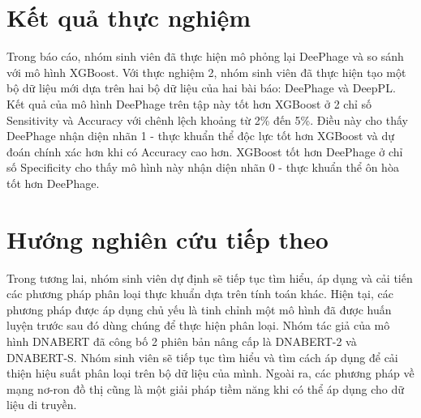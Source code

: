 \section{Kết quả thực nghiệm}
Trong báo cáo, nhóm sinh viên đã thực hiện mô phỏng lại DeePhage và so sánh với mô hình XGBoost. Với thực nghiệm 2, nhóm sinh viên đã thực hiện tạo một bộ dữ liệu mới dựa trên hai bộ dữ liệu của hai bài báo: DeePhage\cite{wu2021deephage} và DeepPL\cite{zhang2024deeppl}. Kết quả của mô hình DeePhage trên tập này tốt hơn XGBoost ở 2 chỉ số Sensitivity và Accuracy với chênh lệch khoảng từ 2\% đến 5\%. Điều này cho thấy DeePhage nhận diện nhãn 1 - thực khuẩn thể độc lực tốt hơn XGBoost và dự đoán chính xác hơn khi có Accuracy cao hơn. XGBoost tốt hơn DeePhage ở chỉ số Specificity cho thấy mô hình này nhận diện nhãn 0 - thực khuẩn thể ôn hòa tốt hơn DeePhage.

\section{Hướng nghiên cứu tiếp theo}
Trong tương lai, nhóm sinh viên dự định sẽ tiếp tục tìm hiểu, áp dụng và cải tiến các phương pháp phân loại thực khuẩn dựa trên tính toán khác. Hiện tại, các phương pháp được áp dụng chủ yếu là tinh chỉnh một mô hình đã được huấn luyện trước sau đó dùng chúng để thực hiện phân loại. Nhóm tác giả của mô hình DNABERT\cite{ji2021dnabert} đã công bố 2 phiên bản nâng cấp là DNABERT-2\cite{zhou2023dnabert} và DNABERT-S\cite{zhou2024dnabert}. Nhóm sinh viên sẽ tiếp tục tìm hiểu và tìm cách áp dụng để cải thiện hiệu suất phân loại trên bộ dữ liệu của mình. Ngoài ra, các phương pháp về mạng nơ-ron đồ thị cũng là một giải pháp tiềm năng khi có thể áp dụng cho dữ liệu di truyền.